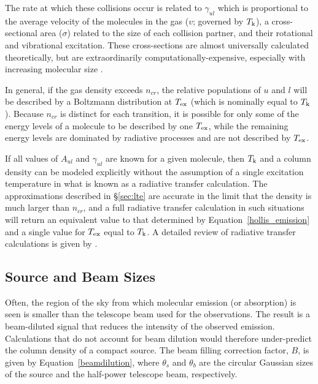 \documentclass[twocolumn]{aastex631}
\begin{document}
The rate at which these collisions occur is related to $\gamma_{ul}$ which is proportional to the average velocity of the molecules in the gas ($v$; governed by $T_{\rm{k}}$), a cross-sectional area ($\sigma$) related to the size of each collision partner, and their rotational and vibrational excitation.   These cross-sections are almost universally calculated theoretically, but are extraordinarily computationally-expensive, especially with increasing molecular size \citep{Faure:2014iu}.

In general, if the gas density exceeds $n_{cr}$, the relative populations of $u$ and $l$ will be described by a Boltzmann distribution at $T_{\rm{ex}}$ (which is nominally equal to $T_{\rm{k}}$).  Because $n_{cr}$ is distinct for each transition, it is possible for only some of the energy levels of a molecule to be described by one $T_{\rm{ex}}$, while the remaining energy levels are dominated by radiative processes and are not described by $T_{\rm{ex}}$.  

If all values of $A_{ul}$ and $\gamma_{ul}$ are known for a given molecule, then $T_{\rm{k}}$ and a column density can be modeled explicitly without the assumption of a single excitation temperature in what is known as a radiative transfer calculation.  The approximations described in \S\ref{sec:lte} are accurate in the limit that the density is much larger than $n_{cr}$, and a full radiative transfer calculation in such situations will return an equivalent value to that determined by Equation~\ref{hollis_emission} and a single value for $T_{\rm{ex}}$ equal to $T_{\rm{k}}$. A detailed review of radiative transfer calculations is given by \citet{vanderTak:2011wd}.

\subsection{Source and Beam Sizes}
\label{sec:dilution}

Often, the region of the sky from which molecular emission (or absorption) is seen is smaller than the telescope beam used for the observations.  The result is a beam-diluted signal that reduces the intensity of the observed emission.  Calculations that do not account for beam dilution would therefore under-predict the column density of a compact source.  The beam filling correction factor, $B$, is given by Equation~\ref{beamdilution}, where $\theta_s$ and $\theta_b$ are the circular Gaussian sizes of the source and the half-power telescope beam, respectively.
\end{document}
